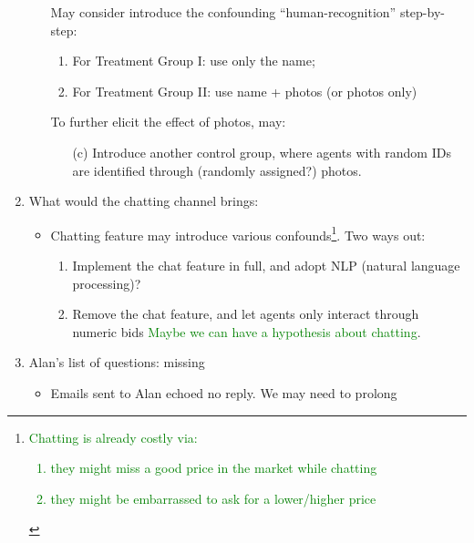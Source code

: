 \documentclass{article}
\begin{document}
\begin{enumerate}
\begin{itemize}
                May consider introduce the confounding ``human-recognition''
                step-by-step:
                \begin{enumerate}
                    \item For Treatment Group I: use only the name;
                    \item For Treatment Group II: use name + photos (or photos
                        only)
                \end{enumerate}
                To further elicit the effect of photos, may:
                \begin{itemize}
                    \item[(c)] Introduce another control group, where agents with
                        random IDs are identified through (randomly assigned?)
                        photos.
                \end{itemize}
        \end{itemize}
    \item What would the chatting channel brings:
        \begin{itemize}
            \item Chatting feature may introduce various confounds\footnote{\textcolor{green}{Chatting is already costly via:\\
            \begin{enumerate}
                \item they might miss a good price in the market while chatting
                \item they might be embarrassed to ask for a lower/higher price
            \end{enumerate}} }. Two ways out:
                \begin{enumerate}
                    \item Implement the chat feature in full, and adopt NLP
                        (natural language processing)?
                    \item Remove the chat feature, and let agents only interact
                        through numeric bids \textcolor{green}{Maybe we can have a hypothesis about chatting}.
                \end{enumerate}
        \end{itemize}
    \item Alan's list of questions: missing
        \begin{itemize}
            \item Emails sent to Alan echoed no reply. We may need to prolong

\end{itemize}
\end{enumerate}
\end{document}
